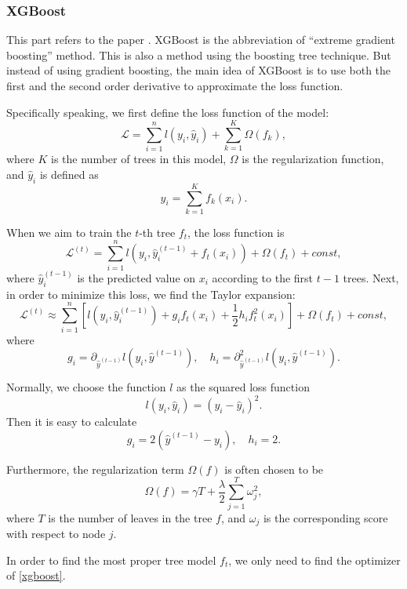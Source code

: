 \documentclass[english]{article}
\begin{document}
\subsubsection{XGBoost}
\par This part refers to the paper \cite{chen1603xgboost}. XGBoost is the abbreviation of ``extreme gradient boosting'' method. This is also a method using the boosting tree technique. But instead of using gradient boosting, the main idea of XGBoost is to use both the first and the second order derivative to approximate the loss function.
\par Specifically speaking, we first define the loss function of the model:
\begin{equation}
	\mathcal{L} = \sum_{i=1}^{n}l(y_{i}, \hat{y}_{i}) + \sum_{k=1}^{K}\Omega(f_{k}),
\end{equation}
where $K$ is the number of trees in this model, $\Omega$ is the regularization function, and $\hat{y}_{i}$ is defined as
\begin{equation}
	\hat{y}_{i} = \sum_{k=1}^{K}f_{k}(x_{i}).
\end{equation}
\par When we aim to train the $t$-th tree $f_{t}$, the loss function is 
\begin{equation}
	\mathcal{L}^{(t)} = \sum_{i=1}^{n}l(y_{i}, \hat{y}_{i}^{(t-1)} + f_{t}(x_{i})) + \Omega(f_{t}) + const,
\end{equation}
where $\hat{y}_{i}^{(t-1)}$ is the predicted value on $x_{i}$ according to the first $t-1$ trees. Next, in order to minimize this loss, we find the Taylor expansion:
\begin{equation}\label{xgboost}
	\mathcal{L}^{(t)}\approx\sum_{i=1}^{n}\left[l(y_{i}, \hat{y}_{i}^{(t-1)}) + g_{i}f_{t}(x_{i}) + \frac{1}{2}h_{i}f_{t}^{2}(x_{i})\right] + \Omega(f_{t}) + const,
\end{equation}
where
\begin{equation}
	g_{i} = \partial_{\hat{y}^{(t-1)}}l(y_{i}, \hat{y}^{(t-1)}), \quad h_{i} = \partial^{2}_{\hat{y}^{(t-1)}}l(y_{i}, \hat{y}^{(t-1)}).
\end{equation}
\par Normally, we choose the function $l$ as the squared loss function
\begin{equation}
	l(y_{i}, \hat{y}_{i}) = (y_{i} - \hat{y}_{i})^{2}.
\end{equation}
Then it is easy to calculate 
\begin{equation}
	g_{i} = 2(\hat{y}^{(t-1)} - y_{i}), \quad h_{i} = 2.
\end{equation}
\par Furthermore, the regularization term $\Omega(f)$ is often chosen to be
\begin{equation}
	\Omega(f) = \gamma T + \frac{\lambda}{2}\sum_{j=1}^{T}\omega_{j}^{2},
\end{equation}
where $T$ is the number of leaves in the tree $f$, and $\omega_{j}$ is the corresponding score with respect to node $j$.
\par In order to find the most proper tree model $f_{t}$, we only need to find the optimizer of \eqref{xgboost}.
\end{document}
